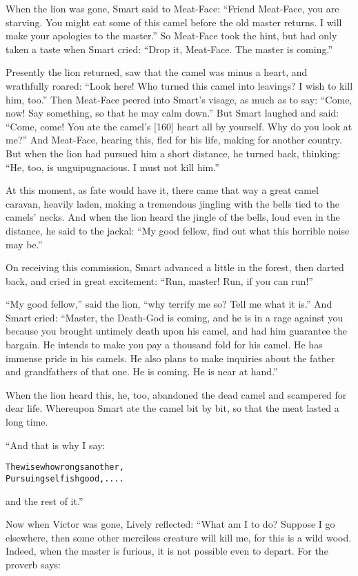\documentclass{article}
\renewenvironment{verbatim}{\begin{alltt}\normalfont\begin{centering}}{\end{centering}\end{alltt}}
\begin{document}
When the lion was gone, Smart said to Meat-Face:
``Friend Meat-Face, you are starving. You might eat some of this camel before the old master returns. I will make your apologies to the master.''
So Meat-Face took the hint, but had only taken a taste when Smart
cried: ``Drop it, Meat-Face. The master is coming.''

Presently the lion returned, saw that the camel was minus a heart,
and wrathfully roared:
``Look here! Who turned this camel into leavings? I wish to kill him, too.''
Then Meat-Face peered into Smart's visage, as much as to say:
``Come, now! Say something, so that he may calm down.'' But Smart
laughed and said:
``Come, come! You ate the camel's [160] heart all by yourself. Why do you look at me?''
And Meat-Face, hearing this, fled for his life, making for another
country. But when the lion had pursued him a short distance, he
turned back, thinking:
``He, too, is unguipugnacious. I must not kill him.''

At this moment, as fate would have it, there came that way a great
camel caravan, heavily laden, making a tremendous jingling with the
bells tied to the camels' necks. And when the lion heard the jingle
of the bells, loud even in the distance, he said to the jackal:
``My good fellow, find out what this horrible noise may be.''

On receiving this commission, Smart advanced a little in the
forest, then darted back, and cried in great excitement:
``Run, master! Run, if you can run!''

``My good fellow,'' said the lion,
``why terrify me so? Tell me what it is.'' And Smart cried:
``Master, the Death-God is coming, and he is in a rage against you because you brought untimely death upon his camel, and had him guarantee the bargain. He intends to make you pay a thousand fold for his camel. He has immense pride in his camels. He also plans to make inquiries about the father and grandfathers of that one. He is coming. He is near at hand.''

When the lion heard this, he, too, abandoned the dead camel and
scampered for dear life. Whereupon Smart ate the camel bit by bit,
so that the meat lasted a long time.

“And that is why I say:

\begin{verbatim}
The wise who wrongs another,
    Pursuing selfish good, ....
\end{verbatim}
and the rest of it.”

Now when Victor was gone, Lively reflected: “What am I to do?
Suppose I go elsewhere, then some other merciless creature will
kill me, for this is a wild wood. Indeed, when the master is
furious, it is not possible even to depart. For the proverb says:
\end{document}
